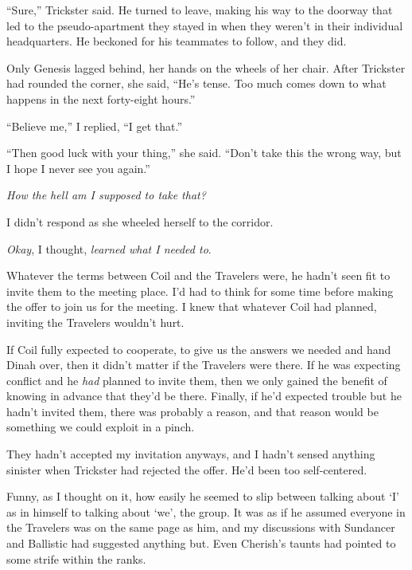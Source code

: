 ``Sure,'' Trickster said.  He turned to leave, making his way to the doorway that led to the pseudo-apartment they stayed in when they weren't in their individual headquarters.  He beckoned for his teammates to follow, and they did.



Only Genesis lagged behind, her hands on the wheels of her chair.  After Trickster had rounded the corner, she said, ``He's tense.  Too much comes down to what happens in the next forty-eight hours.''



``Believe me,'' I replied, ``I get that.''



``Then good luck with your thing,'' she said.  ``Don't take this the wrong way, but I hope I never see you again.''



\emph{How the hell am I supposed to take that?}



I didn't respond as she wheeled herself to the corridor.



\emph{Okay}, I thought, \emph{learned what I needed to}.



Whatever the terms between Coil and the Travelers were, he hadn't seen fit to invite them to the meeting place.  I'd had to think for some time before making the offer to join us for the meeting.  I knew that whatever Coil had planned, inviting the Travelers wouldn't hurt.



If Coil fully expected to cooperate, to give us the answers we needed and hand Dinah over, then it didn't matter if the Travelers were there.  If he was expecting conflict and he \emph{had} planned to invite them, then we only gained the benefit of knowing in advance that they'd be there.  Finally, if he'd expected trouble but he hadn't invited them, there was probably a reason, and that reason would be something we could exploit in a pinch.



They hadn't accepted my invitation anyways, and I hadn't sensed anything sinister when Trickster had rejected the offer.  He'd been too self-centered.



Funny, as I thought on it, how easily he seemed to slip between talking about `I' as in himself to talking about `we', the group.  It was as if he assumed everyone in the Travelers was on the same page as him, and my discussions with Sundancer and Ballistic had suggested anything but.  Even Cherish's taunts had pointed to some strife within the ranks.



